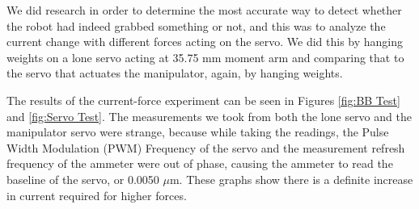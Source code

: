 \documentclass[12pt]{article}
\begin{document}
We did research in order to determine the most accurate way to detect whether the robot had indeed grabbed something or not, and this was to analyze the current change with different forces acting on the servo. We did this by hanging weights on a lone servo acting at 35.75 mm moment arm and comparing that to the servo that actuates the manipulator, again, by hanging weights. 




\begin{figure}[h!]
\centering
{}
\end{figure}
The results of the current-force experiment can be seen in Figures \ref{fig:BB Test} and \ref{fig:Servo Test}. The measurements we took from both the lone servo and the manipulator servo were strange, because while taking the readings, the Pulse Width Modulation (PWM) Frequency of the servo and the measurement refresh frequency of the ammeter were out of phase, causing the ammeter to read the baseline of the servo, or 0.0050 $\mu$m. These graphs show there is a definite increase in current required for higher forces. 
\end{document}
